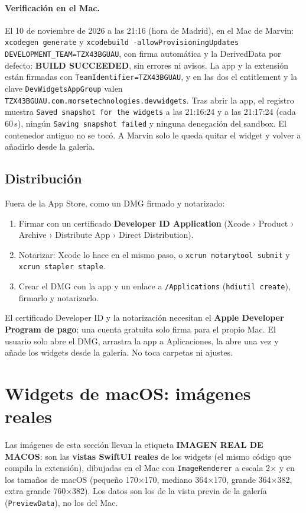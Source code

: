 \documentclass[11pt,a4paper]{article}
\newcommand{\imagenreal}{\textcolor{real}{\textbf{IMAGEN REAL DE MACOS}}}
\begin{document}
\paragraph{Verificación en el Mac.} El 10 de noviembre de 2026 a las
21:16 (hora de Madrid), en el Mac de Marvin: \texttt{xcodegen generate}
y \texttt{xcodebuild -allowProvisioningUpdates
DEVELOPMENT\_TEAM=TZX43BGUAU}, con firma automática y la DerivedData
por defecto: \textbf{BUILD SUCCEEDED}, sin errores ni avisos. La app y
la extensión están firmadas con \texttt{TeamIdentifier=TZX43BGUAU}, y
en las dos el entitlement y la clave \texttt{DevWidgetsAppGroup} valen
\texttt{TZX43BGUAU.com.morsetechnologies.devwidgets}. Tras abrir la
app, el registro muestra \texttt{Saved snapshot for the widgets} a
las 21:16:24 y a las 21:17:24 (cada 60\,s), ningún \texttt{Saving
snapshot failed} y ninguna denegación del sandbox. El contenedor
antiguo no se tocó. A Marvin solo le queda quitar el widget y volver
a añadirlo desde la galería.

\subsection{Distribución}\label{sec:distribucion}
Fuera de la App Store, como un DMG firmado y notarizado:
\begin{enumerate}
  \item Firmar con un certificado \textbf{Developer ID Application}
    (Xcode › Product › Archive › Distribute App › Direct
    Distribution).
  \item Notarizar: Xcode lo hace en el mismo paso, o
    \texttt{xcrun notarytool submit} y \texttt{xcrun stapler staple}.
  \item Crear el DMG con la app y un enlace a \texttt{/Applications}
    (\texttt{hdiutil create}), firmarlo y notarizarlo.
\end{enumerate}
El certificado Developer ID y la notarización necesitan el
\textbf{Apple Developer Program de pago}; una cuenta gratuita solo
firma para el propio Mac. El usuario solo abre el DMG, arrastra la app
a Aplicaciones, la abre una vez y añade los widgets desde la galería.
No toca carpetas ni ajustes.

\section{Widgets de macOS: imágenes reales}\label{sec:imagenes}
Las imágenes de esta sección llevan la etiqueta \imagenreal{}: son
las \textbf{vistas SwiftUI reales} de los widgets (el mismo código que
compila la extensión), dibujadas en el Mac con \texttt{ImageRenderer}
a escala 2$\times$ y en los tamaños de macOS (pequeño 170$\times$170,
mediano 364$\times$170, grande 364$\times$382, extra grande
760$\times$382). Los datos son los de la vista previa de la galería
(\texttt{PreviewData}), no los del Mac.
\end{document}
